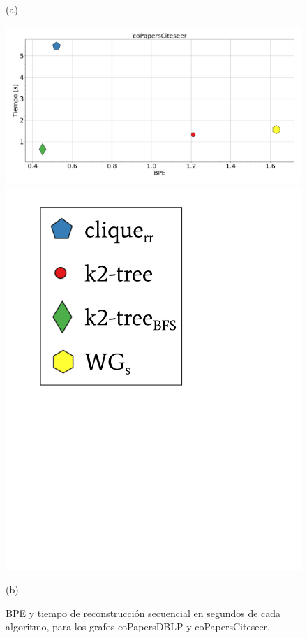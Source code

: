 \begin{figure}
\begin{minipage}{1\textwidth}
    			(a)		
    	\end{minipage}
    	
       	\begin{minipage}{1\textwidth}
    			\centering
    			\begin{minipage}{0.8\textwidth}
    				\centering
    				\includegraphics[width=1\linewidth]{img/bpeTimes/secuencial/coPapersCiteseer.pdf}
    			\end{minipage}
    			\begin{minipage}{0.15\textwidth}
    				\centering
    				\includegraphics[scale=.24, clip, trim=70 320 230 30]{img/bpeTimes/labelSec.pdf}
    			\end{minipage}
    			
    			(b)		
    	\end{minipage}
    	
    \caption{BPE y tiempo de reconstrucción secuencial en segundos de cada algoritmo, para los grafos coPapersDBLP y coPapersCiteseer.}
    \label{fig:bpetSec4}
\end{figure}
